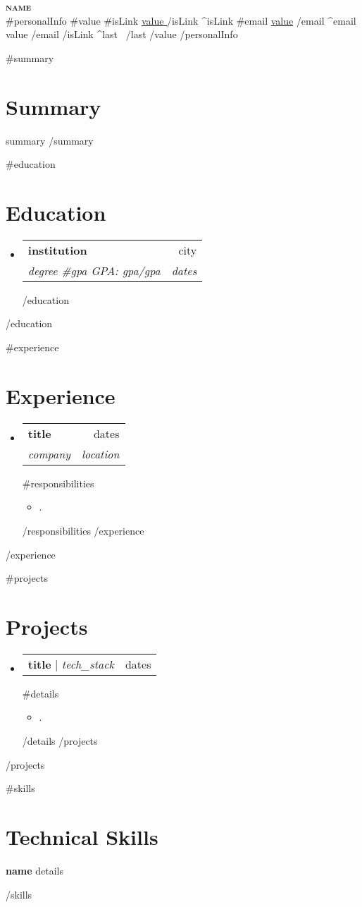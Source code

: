 \documentclass[letterpaper,11pt]{article}
\newcommand{\resumeItem}[1]{
  \item\small{
    {#1 \vspace{-2pt}}
  }
}
\newcommand{\resumeSubheading}[4]{
  \vspace{-2pt}\item
    \begin{tabularx}{\textwidth}{Xr}
      \textbf{#1} & #2 \\
      \textit{\small#3} & \textit{\small #4} \\
    \end{tabularx}\vspace{-7pt}
}
\newcommand{\resumeProjectHeading}[2]{
    \item
    \begin{tabularx}{\textwidth}{Xr}
      \small #1 & #2 \\
    \end{tabularx}\vspace{-7pt}
}
\newcommand{\resumeSubHeadingListStart}{\begin{itemize}[leftmargin=0.15in, label={}]}
\newcommand{\resumeSubHeadingListEnd}{\end{itemize}}
\newcommand{\resumeItemListStart}{\begin{itemize}}
\newcommand{\resumeItemListEnd}{\end{itemize}\vspace{-12pt}}
\begin{document}
\begin{center}
    \textbf{\Huge \scshape {{name}}} \\ \vspace{1pt}
    \small
    {{#personalInfo}}
      {{#value}}
        {{#isLink}}
          \href{ {{{link}}} }{ \underline{ {{value}} } }
        {{/isLink}}
        {{^isLink}}
          {{#email}}
            \underline{{{value}}}
          {{/email}}
          {{^email}}
            {{value}}
          {{/email}}
        {{/isLink}}
        {{^last}} \textbar\ {{/last}}
      {{/value}}
    {{/personalInfo}}
\end{center}
{{#summary}}
\section{Summary}
{{summary}}
{{/summary}}

{{#education}}
\section{Education}
  \resumeSubHeadingListStart
  {{#education}}
    \resumeSubheading
      { {{institution}} }{ {{city}} }
      { {{degree}} {{#gpa}} GPA: {{gpa}}{{/gpa}} }{ {{dates}} }
  {{/education}}
  \resumeSubHeadingListEnd
{{/education}}

{{#experience}}
\section{Experience}
  \resumeSubHeadingListStart
  {{#experience}}
    \resumeSubheading
      { {{title}} }{ {{dates}} }
      { {{company}} }{ {{location}} }
      {{#responsibilities}}
      \resumeItemListStart
        \resumeItem{ {{.}} }
      \resumeItemListEnd
      {{/responsibilities}}
  {{/experience}}
  \resumeSubHeadingListEnd
{{/experience}}

{{#projects}}
\section{Projects}
  \resumeSubHeadingListStart
  {{#projects}}
    \resumeProjectHeading
      { {\textbf{title}} $|$ \emph{ {{tech_stack}} } }{ {{dates}} }
      {{#details}}
      \resumeItemListStart
        \resumeItem{ {{.}} }
      \resumeItemListEnd
      {{/details}}
  {{/projects}}
  \resumeSubHeadingListEnd
{{/projects}}

{{#skills}}
\section{Technical Skills}
 \begin{itemize}[leftmargin=0.15in, label={}]
    \small{\item{
      \textbf{ {{name}} }{ {{details}} } \\
    }}
 \end{itemize}
{{/skills}}

\end{document}
